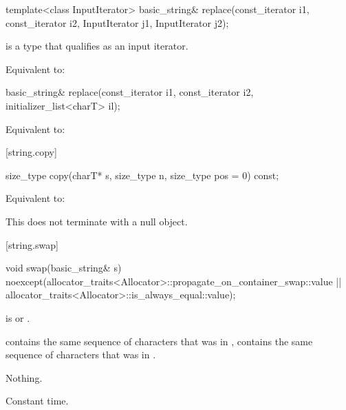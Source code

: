 %
\begin{itemdecl}
template<class InputIterator>
  basic_string& replace(const_iterator i1, const_iterator i2, InputIterator j1, InputIterator j2);
\end{itemdecl}

\begin{itemdescr}
\pnum
\constraints
{} is a type that qualifies as an input
iterator.

\pnum
\effects
Equivalent to: 
\end{itemdescr}

%
\begin{itemdecl}
basic_string& replace(const_iterator i1, const_iterator i2, initializer_list<charT> il);
\end{itemdecl}

\begin{itemdescr}
\pnum
\effects
Equivalent to: 
\end{itemdescr}

[string.copy]{}

%
\begin{itemdecl}
size_type copy(charT* s, size_type n, size_type pos = 0) const;
\end{itemdecl}

\begin{itemdescr}
\pnum
\effects
Equivalent to:
\begin{note} This does not terminate  with a null object. \end{note}
\end{itemdescr}

[string.swap]{}

%
\begin{itemdecl}
void swap(basic_string& s)
  noexcept(allocator_traits<Allocator>::propagate_on_container_swap::value ||
           allocator_traits<Allocator>::is_always_equal::value);
\end{itemdecl}

\begin{itemdescr}
\pnum
\expects
{} is 
or
.

\pnum
\ensures
{}
contains the same sequence of characters that was in ,
 contains the same sequence of characters that was in
.

\pnum
\throws Nothing.

\pnum
\complexity Constant time.
\end{itemdescr}

